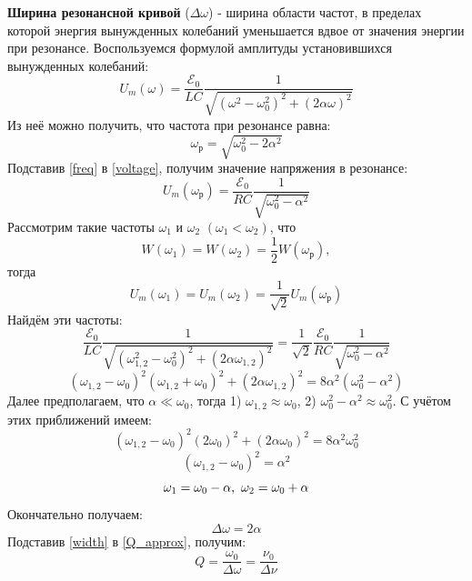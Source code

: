 \documentclass[15pt,a5paper,reqno]{article}
\begin{document}
    \textbf{Ширина резонансной кривой} ($\Delta\omega$) - ширина области частот, в пределах которой энергия вынужденных колебаний уменьшается вдвое от значения энергии при резонансе.
    Воспользуемся формулой амплитуды установившихся вынужденных колебаний:
    \begin{equation}\label{voltage}
        U_m(\omega) = \frac{\mathcal{E}_0}{LC}\frac{1}{\sqrt{(\omega^2 - \omega_0^2)^2 + (2\alpha\omega)^2}}
    \end{equation}
    Из неё можно получить, что частота при резонансе равна:
    \begin{equation}\label{freq}
        \omega_{\text{р}} = \sqrt{\omega_0^2 - 2\alpha^2}
    \end{equation}
    Подставив \eqref{freq} в \eqref{voltage}, получим значение напряжения в резонансе:
    \begin{equation*}
        U_m(\omega_{\text{р}}) = \frac{\mathcal{E}_0}{RC}\frac{1}{\sqrt{\omega_0^2 - \alpha^2}}
    \end{equation*}
    Рассмотрим такие частоты $\omega_1$ и $\omega_2$ $(\omega_1 < \omega_2)$, что
    \[W(\omega_1) = W(\omega_2) = \frac{1}{2}W(\omega_{\text{р}}),\]
    тогда
    \[U_m(\omega_1) = U_m(\omega_2) = \frac{1}{\sqrt{2}} U_m(\omega_{\text{р}})\]
    Найдём эти частоты:
    \[\frac{\mathcal{E}_0}{LC}\frac{1}{\sqrt{(\omega_{1,2}^2 - \omega_0^2)^2 + (2\alpha\omega_{1,2})^2}} = \frac{1}{\sqrt{2}}\frac{\mathcal{E}_0}{RC}\frac{1}{\sqrt{\omega_0^2 - \alpha^2}}\]
    \[(\omega_{1,2} - \omega_0)^2(\omega_{1,2} + \omega_0)^2 + (2\alpha\omega_{1,2})^2 = 8\alpha^2(\omega_0^2 - \alpha^2)\]
    Далее предполагаем, что $\alpha \ll \omega_0$, тогда 1) $\omega_{1, 2} \approx \omega_0$, 2) $\omega_0^2 - \alpha^2 \approx \omega_0^2$. С учётом этих приближений имеем:
    \[(\omega_{1,2} - \omega_0)^2(2\omega_0)^2 + (2\alpha\omega_0)^2 = 8\alpha^2\omega_0^2\]
    \[(\omega_{1,2} - \omega_0)^2 = \alpha^2\]
    \[\omega_1 = \omega_0 - \alpha,\\\ \omega_2 = \omega_0 + \alpha\]
    Окончательно получаем:
    \begin{equation}\label{width}
        \Delta\omega = 2\alpha  
    \end{equation}
    Подставив \eqref{width} в \eqref{Q_approx}, получим:
    \begin{equation}\label{Q_width}
        \boxed{Q = \frac{\omega_0}{\Delta\omega} = \frac{\nu_0}{\Delta\nu}} 
    \end{equation}
\end{document}
